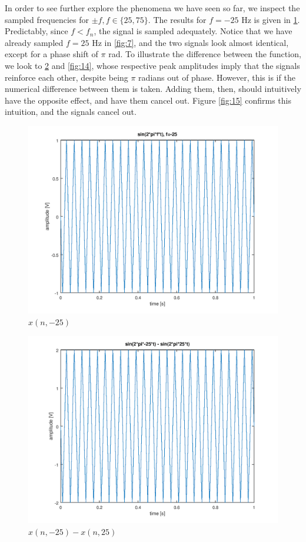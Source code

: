 \documentclass[a4paper, 12pt]{report}
\begin{document}
			In order to see further explore the phenomena we have seen so far, we inspect the sampled frequencies for $\pm f, f \in \{25, 75\}$. The results for $f = -25$ Hz is given in \ref{fig:12}. Predictably, since $f < f_n$, the signal is sampled adequately. Notice that we have already sampled $f = 25$ Hz in \ref{fig:7}, and the two signals look almost identical, except for a phase shift of $\pi$ rad. To illustrate the difference between the function, we look to \ref{fig:13} and \ref{fig:14}, whose respective peak amplitudes imply that the signals reinforce each other, despite being $\pi$ radians out of phase. However, this is if the numerical difference between them is taken. Adding them, then, should intuitively have the opposite effect, and have them cancel out. Figure \ref{fig:15} confirms this intuition, and the signals cancel out.

			\begin{figure}[H]
				\includegraphics[width=\textwidth]{img/1_12_-25.png}
				\caption{$x(n, -25)$}
				\label{fig:12}
			\end{figure}

			\begin{figure}[H]
				\includegraphics[width=\textwidth]{img/1_13_diff.png}
				\caption{$x(n, -25) - x(n, 25)$}
				\label{fig:13}
			\end{figure}
\end{document}
